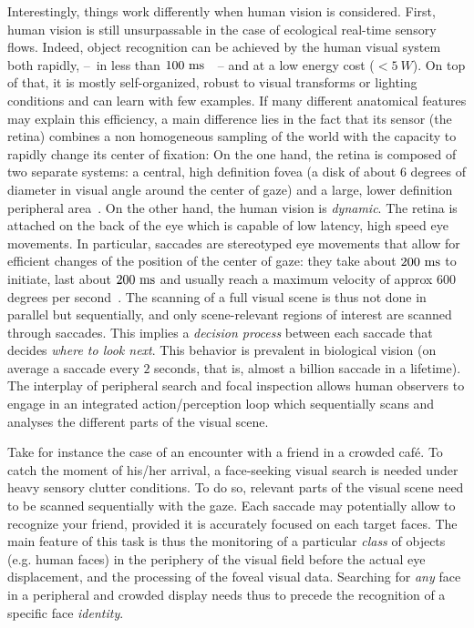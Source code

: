 Interestingly, things work differently when human vision is considered. First, human vision is
still unsurpassable in the case of ecological real-time sensory flows.
Indeed, object recognition can be achieved by the human visual system both rapidly, --~in less than $100~\si{\milli\second}$~\cite{Kirchner06}~-- and at a low energy cost ($<5~W$).
On top of that, it is mostly self-organized, robust to visual transforms or lighting conditions and can learn with few examples. If many different anatomical features may explain this efficiency, a main difference lies in the fact that its sensor (the retina) combines a non homogeneous sampling of the world with the capacity to rapidly change its center of fixation: On the one hand, the retina is composed of two separate systems: a central, high definition fovea (a disk of about 6 degrees of diameter in visual angle around the center of gaze) and a large, lower definition peripheral area~\cite{Strasburger11}.
On the other hand, the human vision is \emph{dynamic}. The retina is attached on the back of the eye which is capable of low latency, high speed eye movements. In particular, saccades are stereotyped eye movements that allow for efficient changes of the position of the center of gaze: they take about $200~\si{\milli\second}$ to initiate, last about $200~\si{\milli\second}$ and usually reach a maximum velocity of approx 600 degrees per second~\cite{Bahill75}. The scanning of a full visual scene is thus not done in parallel but sequentially, and only scene-relevant regions of interest are scanned through saccades. This implies a \emph{decision process} between each saccade that decides \emph{where to look next}. This behavior is prevalent in biological vision (on average a saccade every $2$ seconds, that is, almost a billion saccade in a lifetime). The interplay of peripheral search and focal inspection allows human observers to engage in an integrated action/perception loop which sequentially scans and analyses the different parts of the visual scene.


Take for instance the case of an encounter with a friend in a crowded café. To catch the moment of his/her arrival, a face-seeking visual search is needed under heavy sensory clutter conditions. To do so, relevant parts of the visual scene need to be scanned sequentially with the gaze. Each saccade may potentially allow to recognize your friend, provided it is accurately focused on each target faces. The main feature of this task is thus the monitoring of a particular \emph{class} of objects (e.g. human faces) in the periphery of the visual field before the actual eye displacement, and the processing of the foveal visual data.
Searching for \emph{any} face in a peripheral and crowded display needs thus to precede the recognition of a specific face \emph{identity}.

